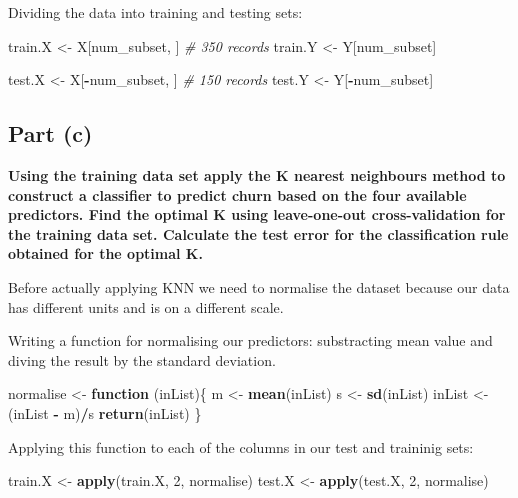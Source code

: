 \documentclass[
]{article}
\newenvironment{Shaded}{\begin{snugshade}}{\end{snugshade}}
\newcommand{\CommentTok}[1]{\textcolor[rgb]{0.56,0.35,0.01}{\textit{#1}}}
\newcommand{\ControlFlowTok}[1]{\textcolor[rgb]{0.13,0.29,0.53}{\textbf{#1}}}
\newcommand{\DecValTok}[1]{\textcolor[rgb]{0.00,0.00,0.81}{#1}}
\newcommand{\KeywordTok}[1]{\textcolor[rgb]{0.13,0.29,0.53}{\textbf{#1}}}
\newcommand{\NormalTok}[1]{#1}
\newcommand{\OperatorTok}[1]{\textcolor[rgb]{0.81,0.36,0.00}{\textbf{#1}}}
\newcommand{\StringTok}[1]{\textcolor[rgb]{0.31,0.60,0.02}{#1}}
\begin{document}
Dividing the data into training and testing sets:

\begin{Shaded}
\begin{Highlighting}[]
\NormalTok{train.X <-}\StringTok{ }\NormalTok{X[num_subset, ] }\CommentTok{# 350 records}
\NormalTok{train.Y <-}\StringTok{ }\NormalTok{Y[num_subset]}

\NormalTok{test.X <-}\StringTok{ }\NormalTok{X[}\OperatorTok{-}\NormalTok{num_subset, ] }\CommentTok{# 150 records}
\NormalTok{test.Y <-}\StringTok{ }\NormalTok{Y[}\OperatorTok{-}\NormalTok{num_subset]}
\end{Highlighting}
\end{Shaded}

\hypertarget{part-c}{%
\subsection{\texorpdfstring{\textbf{Part (c)}}{Part (c)}}\label{part-c}}

\textbf{Using the training data set apply the K nearest neighbours
method to construct a classifier to predict churn based on the four
available predictors. Find the optimal K using leave-one-out
cross-validation for the training data set. Calculate the test error for
the classification rule obtained for the optimal K.}

Before actually applying KNN we need to normalise the dataset because
our data has different units and is on a different scale.

Writing a function for normalising our predictors: substracting mean
value and diving the result by the standard deviation.

\begin{Shaded}
\begin{Highlighting}[]
\NormalTok{normalise <-}\StringTok{ }\ControlFlowTok{function}\NormalTok{ (inList)\{}
\NormalTok{  m <-}\StringTok{ }\KeywordTok{mean}\NormalTok{(inList)}
\NormalTok{  s <-}\StringTok{ }\KeywordTok{sd}\NormalTok{(inList)}
\NormalTok{  inList <-}\StringTok{ }\NormalTok{(inList }\OperatorTok{-}\StringTok{ }\NormalTok{m)}\OperatorTok{/}\NormalTok{s}
  \KeywordTok{return}\NormalTok{(inList)}
\NormalTok{\}}
\end{Highlighting}
\end{Shaded}

Applying this function to each of the columns in our test and traininig
sets:

\begin{Shaded}
\begin{Highlighting}[]
\NormalTok{train.X <-}\StringTok{ }\KeywordTok{apply}\NormalTok{(train.X, }\DecValTok{2}\NormalTok{, normalise)}
\NormalTok{test.X <-}\StringTok{ }\KeywordTok{apply}\NormalTok{(test.X, }\DecValTok{2}\NormalTok{, normalise)}
\end{Highlighting}
\end{Shaded}
\end{document}
